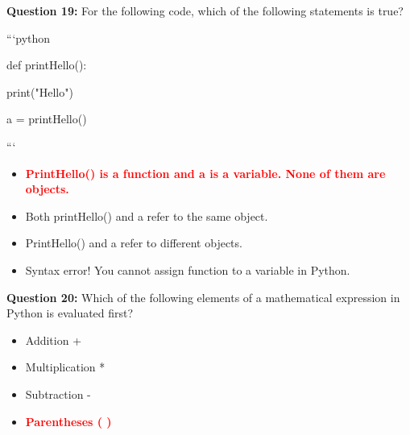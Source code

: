 \documentclass[12pt,a4paper]{article}
\begin{document}
\vspace{0.5cm}

\textbf{Question 19:} For the following code, which of the following statements is true?\newline

\newline
\newline

\newline
```python\newline

\newline
def printHello():\newline

\newline
    print("Hello")\newline

\newline
\newline

\newline
a = printHello()\newline

\newline
```

\begin{itemize}
    \item[\textbf{A.}] \textcolor{red}{\textbf{PrintHello() is a function and a is a variable. None of them are objects.}}
    \item[\textbf{B.}] Both printHello() and a refer to the same object.
    \item[\textbf{C.}] PrintHello() and a refer to different objects.
    \item[\textbf{D.}] Syntax error! You cannot assign function to a variable in Python.
\end{itemize}

\vspace{0.5cm}

\textbf{Question 20:} Which of the following elements of a mathematical expression in Python is evaluated first?

\begin{itemize}
    \item[\textbf{A.}] Addition +
    \item[\textbf{B.}] Multiplication *
    \item[\textbf{C.}] Subtraction -
    \item[\textbf{D.}] \textcolor{red}{\textbf{Parentheses ( )}}
\end{itemize}
\end{document}
